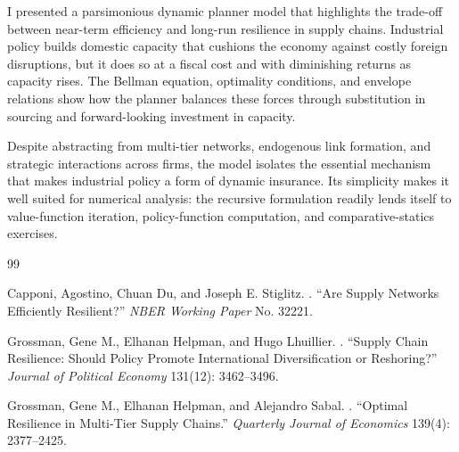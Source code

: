 \documentclass[11pt]{article}
\begin{document}
I presented a parsimonious dynamic planner model that highlights the trade-off between near-term efficiency and long-run resilience in supply chains. Industrial policy builds domestic capacity that cushions the economy against costly foreign disruptions, but it does so at a fiscal cost and with diminishing returns as capacity rises. The Bellman equation, optimality conditions, and envelope relations show how the planner balances these forces through substitution in sourcing and forward-looking investment in capacity.

Despite abstracting from multi-tier networks, endogenous link formation, and strategic interactions across firms, the model isolates the essential mechanism that makes industrial policy a form of dynamic insurance. Its simplicity makes it well suited for numerical analysis: the recursive formulation readily lends itself to value-function iteration, policy-function computation, and comparative-statics exercises.

\begin{thebibliography}{99}

Capponi, Agostino, Chuan Du, and Joseph E. Stiglitz.
.
\newblock ``Are Supply Networks Efficiently Resilient?''
\newblock \emph{NBER Working Paper} No. 32221.

Grossman, Gene M., Elhanan Helpman, and Hugo Lhuillier.
.
\newblock ``Supply Chain Resilience: Should Policy Promote International Diversification or Reshoring?''
\newblock \emph{Journal of Political Economy} 131(12): 3462--3496.

Grossman, Gene M., Elhanan Helpman, and Alejandro Sabal.
.
\newblock ``Optimal Resilience in Multi-Tier Supply Chains.''
\newblock \emph{Quarterly Journal of Economics} 139(4): 2377--2425.

\end{thebibliography}
\end{document}
